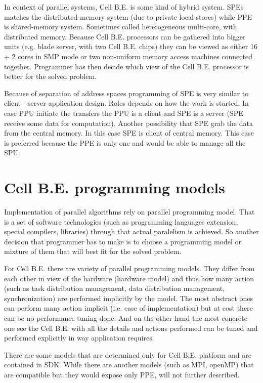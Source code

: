 In context of parallel systems, Cell B.E. is some kind of hybrid system.
SPEs matches the distributed-memory system (due to private local stores) while PPE is shared-memory system.
Sometimes called heterogeneous multi-core, with distributed memory.
Because Cell B.E. processors can be gathered into bigger units (e.g. blade server, with two Cell B.E. chips) they can be viewed as either 16 + 2 cores in SMP mode or two non-uniform memory access machines connected together.
Programmer has then decide which view of the Cell B.E. processor is better for the solved problem.

\par
Because of separation of address spaces programming of SPE is very similar to client - server application design.
Roles depends on how the work is started.
In case PPU initiate the transfers the PPU is a client and SPE is a server (SPE receive some data for computation).
Another possibility that SPE grab the data from the central memory.
In this case SPE is client of central memory.
This case is preferred because the PPE is only one and would be able to manage all the SPU.

\section{Cell B.E. programming models}

\par
Implementation of parallel algorithms rely on parallel programming model.
That is a set of software technologies (such as programming languages extension, special compilers, libraries) through that actual paralelism is achieved.
So another decision that programmer has to make is to choose a programming model or mixture of them that will best fit for the solved problem.

\par
For Cell B.E. there are variety of parallel programming models.
They differ from each other in view of the hardware (hardware model) and thus how many action (such as task distribution management, data distribution management, synchronization) are performed implicitly by the model.
 The most abstract ones can perform many action implicit (i.e. ease of implementation) but at cost there can be no performance tuning done.
 And on the other hand the most concrete one see the Cell B.E. with all the details and actions performed can be tuned and performed explicitly in way application requires.

\par
There are some models that are determined only for Cell B.E. platform and are contained in SDK.
 While there are another models (such as MPI, openMP) that are compatible but they would expose only PPE, will not further described.

